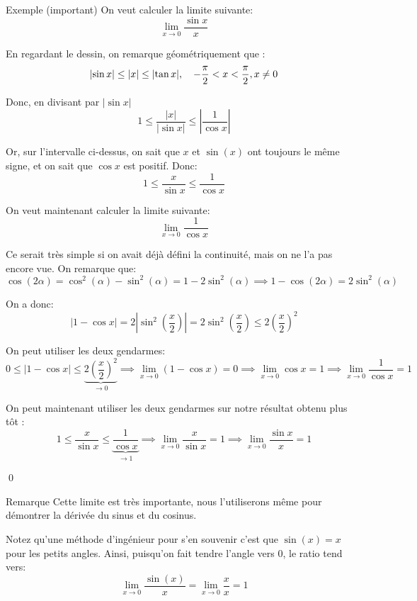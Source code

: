 \documentclass[a4paper]{article}
\begin{document}
\begin{parag}{Exemple (important)}
    On veut calculer la limite suivante:
    \[\lim_{x \to 0} \frac{\sin x}{x} \]


    En regardant le dessin, on remarque géométriquement que :
    \[\left|\sin x\right| \leq \left|x\right| \leq \left|\tan x\right|, \mathspace -\frac{\pi}{2} < x < \frac{\pi}{2}, x \neq 0\]

    Donc, en divisant par $\left|\sin x\right|$
    \[1 \leq \frac{\left|x\right|}{\left|\sin x\right|} \leq \left|\frac{1}{\cos x}\right|\]

    Or, sur l'intervalle ci-dessus, on sait que $x$ et $\sin\left(x\right)$ ont toujours le même signe, et on sait que $\cos x$ est positif. Donc:
    \[1 \leq \frac{x}{\sin x} \leq \frac{1}{\cos x}\]

    On veut maintenant calculer la limite suivante:
    \[\lim_{x \to 0} \frac{1}{\cos x}\]

    Ce serait très simple si on avait déjà défini la continuité, mais on ne l'a pas encore vue. On remarque que:
    \[\cos\left(2\alpha\right) = \cos^2\left(\alpha\right) - \sin^2\left(\alpha\right) = 1 - 2\sin^2\left(\alpha\right) \implies 1 - \cos\left(2\alpha\right) = 2\sin^2\left(\alpha\right)\]

    On a donc:
    \[\left|1 - \cos x\right| = 2 \left|\sin^2\left(\frac{x}{2}\right)\right| = 2\sin^2\left(\frac{x}{2}\right) \leq 2\left(\frac{x}{2}\right)^2\]

    On peut utiliser les deux gendarmes:
    \[0 \leq \left|1 - \cos x\right| \leq \underbrace{2\left(\frac{x}{2}\right)^2}_{\to 0} \implies \lim_{x \to 0} \left(1 - \cos x\right) = 0 \implies \lim_{x \to 0} \cos x = 1 \implies \lim_{x \to 0} \frac{1}{\cos x} = 1\]

    On peut maintenant utiliser les deux gendarmes sur notre résultat obtenu plus tôt :
    \[1 \leq \frac{x}{\sin x} \leq \underbrace{\frac{1}{\cos x}}_{\to 1} \implies \lim_{x \to 0} \frac{x}{\sin x} = 1 \implies \lim_{x \to 0} \frac{\sin x}{x} = 1 \]

    \qed

    \begin{subparag}{Remarque}
        Cette limite est très importante, nous l'utiliserons même pour démontrer la dérivée du sinus et du cosinus.

        Notez qu'une méthode d'ingénieur pour s'en souvenir c'est que $\sin\left(x\right) = x$ pour les petits angles. Ainsi, puisqu'on fait tendre l'angle vers 0, le ratio tend vers: 
        \[\lim_{x \to 0} \frac{\sin\left(x\right)}{x} = \lim_{x \to 0} \frac{x}{x} = 1\]


\end{subparag}
\end{parag}
\end{document}

